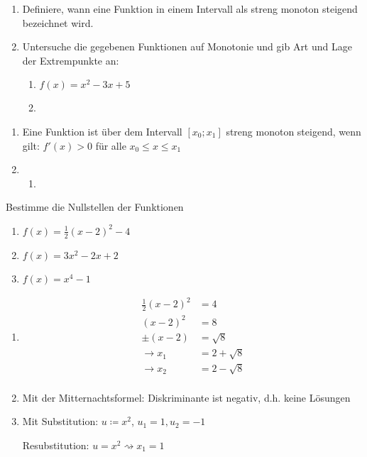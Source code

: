 \begin{enumerate}
	\item Definiere, wann eine Funktion in einem Intervall als streng monoton steigend bezeichnet wird.
	\item Untersuche die gegebenen Funktionen auf Monotonie und gib Art und Lage der Extrempunkte an:
	\begin{enumerate}
		\item $f(x)=x^2-3x+5$
		\item
	\end{enumerate}
\end{enumerate}
\begin{lsg}{}
	\begin{enumerate}
		\item Eine Funktion ist über dem Intervall $[x_0;x_1]$ streng monoton steigend, wenn gilt: $f'(x)>0$ für alle $x_0\leq x \leq x_1$
		\item
		\begin{enumerate}
			\item
		\end{enumerate}
	\end{enumerate}
\end{lsg}










 Bestimme die Nullstellen der Funktionen
\begin{multicols}{3}
  \begin{enumerate}
    \item $f(x) = \frac 1 2 (x-2)^2 -4$
    \item $f(x) = 3x^2-2x+2$
    \item $f(x) = x^4-1$
  \end{enumerate}
\end{multicols}

\begin{lsg}{}
  \begin{multicols}{3}
    \begin{enumerate}
      \item \begin{align*}
        \frac 1 2 (x-2)^2 &= 4\\
        (x-2)^2 &= 8\\
        \pm(x-2)&=\sqrt 8\\
        \rightarrow x_1&=2+\sqrt 8\\
        \rightarrow x_2&=2-\sqrt 8\\
      \end{align*}
      \columnbreak
      \item Mit der Mitternachtsformel: Diskriminante ist negativ, d.h. keine Lösungen
      \columnbreak
      \item Mit Substitution: $u\coloneqq x^2$, $u_1=1, u_2=-1$

			Resubstitution: $u=x^2 \rightsquigarrow x_1=1$
    \end{enumerate}
  \end{multicols}
\end{lsg}






